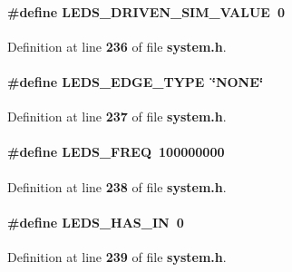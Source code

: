 \paragraph[{L\+E\+D\+S\+\_\+\+D\+R\+I\+V\+E\+N\+\_\+\+S\+I\+M\+\_\+\+V\+A\+L\+UE}]{\setlength{\rightskip}{0pt plus 5cm}\#define L\+E\+D\+S\+\_\+\+D\+R\+I\+V\+E\+N\+\_\+\+S\+I\+M\+\_\+\+V\+A\+L\+UE~0}\label{system_8h_a26df952dff9fb7b1fabf23972b9abfeb}


Definition at line {\bf 236} of file {\bf system.\+h}.

\paragraph[{L\+E\+D\+S\+\_\+\+E\+D\+G\+E\+\_\+\+T\+Y\+PE}]{\setlength{\rightskip}{0pt plus 5cm}\#define L\+E\+D\+S\+\_\+\+E\+D\+G\+E\+\_\+\+T\+Y\+PE~\char`\"{}N\+O\+NE\char`\"{}}\label{system_8h_ac035e375d88859d4348046261c6a9481}


Definition at line {\bf 237} of file {\bf system.\+h}.

\paragraph[{L\+E\+D\+S\+\_\+\+F\+R\+EQ}]{\setlength{\rightskip}{0pt plus 5cm}\#define L\+E\+D\+S\+\_\+\+F\+R\+EQ~100000000}\label{system_8h_a5d22599e2c5c419e205a156afe4f3044}


Definition at line {\bf 238} of file {\bf system.\+h}.

\paragraph[{L\+E\+D\+S\+\_\+\+H\+A\+S\+\_\+\+IN}]{\setlength{\rightskip}{0pt plus 5cm}\#define L\+E\+D\+S\+\_\+\+H\+A\+S\+\_\+\+IN~0}\label{system_8h_a8e0adb0b32d04c003e5f85f9b4cb5371}


Definition at line {\bf 239} of file {\bf system.\+h}.

